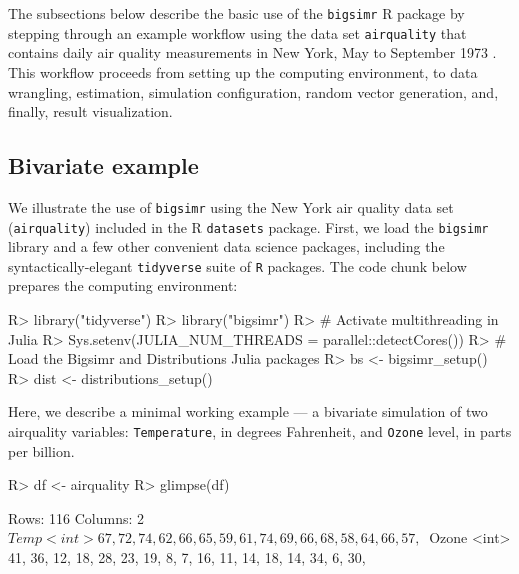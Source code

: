 \documentclass[
]{jss}
\begin{document}
The subsections below describe the basic use of the \texttt{bigsimr} R package by stepping through an example workflow using the data set \texttt{airquality} that contains daily air quality measurements in New York, May to September 1973 \citep{Chambers1983}. This workflow proceeds from setting up the computing environment, to data wrangling, estimation, simulation configuration, random vector generation, and, finally, result visualization.

\hypertarget{bivariate-example}{%
\subsection{Bivariate example}\label{bivariate-example}}

We illustrate the use of \texttt{bigsimr} using the New York air quality data set (\texttt{airquality}) included in the R \texttt{datasets} package. First, we load the \texttt{bigsimr} library and a few other convenient data science packages, including the syntactically-elegant \texttt{tidyverse} suite of \texttt{R} packages. The code chunk below prepares the computing environment:

\begin{CodeChunk}
\begin{CodeInput}
R> library("tidyverse")
R> library("bigsimr")
R> # Activate multithreading in Julia
R> Sys.setenv(JULIA_NUM_THREADS = parallel::detectCores())
R> # Load the Bigsimr and Distributions Julia packages
R> bs <- bigsimr_setup()
R> dist <- distributions_setup()
\end{CodeInput}
\end{CodeChunk}

Here, we describe a minimal working example --- a bivariate simulation of two airquality variables: \texttt{Temperature}, in degrees Fahrenheit, and \texttt{Ozone} level, in parts per billion.

\begin{CodeChunk}
\begin{CodeInput}
R> df <- airquality %
R> glimpse(df)
\end{CodeInput}
\begin{CodeOutput}
Rows: 116
Columns: 2
$ Temp  <int> 67, 72, 74, 62, 66, 65, 59, 61, 74, 69, 66, 68, 58, 64, 66, 57, ~
$ Ozone <int> 41, 36, 12, 18, 28, 23, 19, 8, 7, 16, 11, 14, 18, 14, 34, 6, 30,~
\end{CodeOutput}
\end{CodeChunk}
\end{document}
